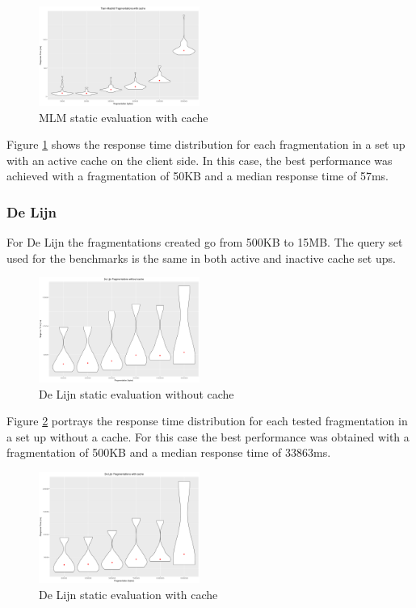 \documentclass[sw]{iosart2x}
\begin{document}
	\begin{figure}[h]
		\includegraphics[width=0.47\textwidth]{mlm/static_cache.png}
		\caption{MLM static evaluation with cache}\label{fig:mlm_static_cache}
	\end{figure}
	
	Figure \ref{fig:mlm_static_cache} shows the response time distribution for each fragmentation in a set up with an active cache on the client side. In this case, the best performance was achieved with a fragmentation of 50KB and a median response time of 57ms.
	
	\subsubsection{De Lijn}
	For De Lijn the fragmentations created go from 500KB to 15MB. The query set used for the benchmarks is the same in both active and inactive cache set ups.
	
	\begin{figure}[h]
		\includegraphics[width=0.47\textwidth]{delijn/no_cache.png}
		\caption{De Lijn static evaluation without cache}\label{fig:delijn_no_cache}
	\end{figure}
	
	Figure \ref{fig:delijn_no_cache} portrays the response time distribution for each tested fragmentation in a set up without a cache. For this case the best performance was obtained with a fragmentation of 500KB and a median response time of 33863ms.
	
	\begin{figure}[h]
		\includegraphics[width=0.47\textwidth]{delijn/cache.png}
		\caption{De Lijn static evaluation with cache}\label{fig:delijn_cache}
	\end{figure}
	
\end{document}
